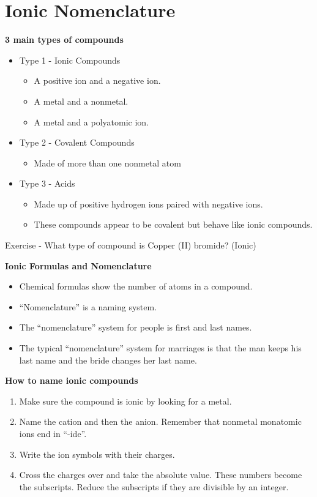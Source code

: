 \documentclass[../hchem.tex]{subfiles}
\begin{document}
\section{Ionic Nomenclature}
\textbf{3 main types of compounds}
\begin{itemize}
    \item Type 1 - Ionic Compounds 
    \begin{itemize}
        \item A positive ion and a negative ion.
        \item A metal and a nonmetal.
        \item A metal and a polyatomic ion.
    \end{itemize}
    \item Type 2 - Covalent Compounds
    \begin{itemize}
        \item Made of more than one nonmetal atom 
    \end{itemize}
    \item Type 3 - Acids 
    \begin{itemize}
        \item Made up of positive hydrogen ions paired with negative ions.
        \item These compounds appear to be covalent but behave like ionic compounds.
    \end{itemize}
\end{itemize}

Exercise - What type of compound is Copper (II) bromide? (Ionic)

\textbf{Ionic Formulas and Nomenclature}
\begin{itemize}
    \item Chemical formulas show the number of atoms in a compound.
    \item ``Nomenclature'' is a naming system.
    \item The ``nomenclature'' system for people is first and last names.
    \item The typical ``nomenclature'' system for marriages is that the man keeps his last name and the bride changes her last name.
\end{itemize}

\textbf{How to name ionic compounds}
\begin{enumerate}
    \item Make sure the compound is ionic by looking for a metal.
    \item Name the cation and then the anion. Remember that nonmetal monatomic ions end in ``-ide''.
    \item Write the ion symbols with their charges.
    \item Cross the charges over and take the absolute value. These numbers become the subscripts. Reduce the subscripts if they are divisible by an integer.
\end{enumerate}
\end{document}
